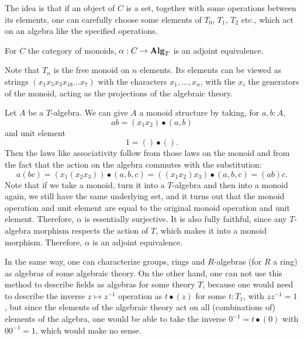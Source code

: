 The idea is that if an object of $ C $ is a set, together with some operations between its elements, one can carefully choose some elements of $ T_0 $, $ T_1 $, $ T_2 $ etc., which act on an algebra like the specified operations.

\begin{example}
  For $ C $ the category of monoids, $ \alpha: C \to \mathbf{Alg}_{T} $ is an adjoint equivalence.

  Note that $ T_n $ is the free monoid on $ n $ elements. Its elements can be viewed as strings $ (x_1 x_5 x_3 x_{18} \dots x_7) $ with the characters $ x_1, \dots, x_n $, with the $ x_i $ the generators of the monoid, acting as the projections of the algebraic theory.

  Let $ A $ be a $ T $-algebra. We can give $ A $ a monoid structure by taking, for $ a, b: A $,
  \[ a b = (x_1 x_2) \bullet (a, b) \]
  and unit element
  \[ 1 = () \bullet (). \]
  Then the laws like associativity follow from those laws on the monoid and from the fact that the action on the algebra commutes with the substitution:
  \[ a (b c) = (x_1 (x_2 x_3)) \bullet (a, b, c) = ((x_1 x_2) x_3) \bullet (a, b, c) = (a b) c. \]
  Note that if we take a monoid, turn it into a $ T $-algebra and then into a monoid again, we still have the same underlying set, and it turns out that the monoid operation and unit element are equal to the original monoid operation and unit element. Therefore, $ \alpha $ is essentially surjective. It is also fully faithful, since any $ T $-algebra morphism respects the action of $ T $, which makes it into a monoid morphism. Therefore, $ \alpha $ is an adjoint equivalence.
\end{example}

\begin{remark}
  In the same way, one can characterize groups, rings and $ R $-algebras (for $ R $ a ring) as algebras of some algebraic theory. On the other hand, one can not use this method to describe fields as algebras for some theory $ T $, because one would need to describe the inverse $ z \mapsto z^{-1} $ operation as $ t \bullet (z) $ for some $ t: T_1 $, with $ z z^{-1} = 1 $, but since the elements of the algebraic theory act on all (combinations of) elements of the algebra, one would be able to take the inverse $ 0^{-1} = t \bullet (0) $ with $ 0 0^{-1} = 1 $, which would make no sense.
\end{remark}

